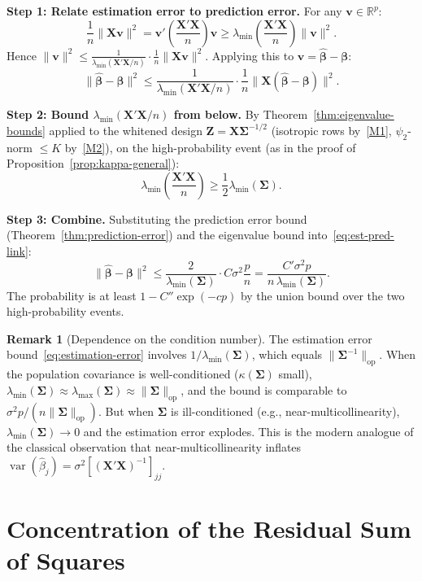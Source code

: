 \documentclass[12pt,a4paper]{article}
\makeatletter
\theoremstyle{definition}
\newtheorem{remark}[theorem]{Remark}
\renewenvironment{proof}[1][\proofname]{\par
  \pushQED{\qed}%
  \normalfont \topsep6\p@\@plus6\p@\relax
  \trivlist
  \item[\hskip\labelsep\bfseries #1\@addpunct{.}]\ignorespaces
}{%
  \popQED\endtrivlist\@endpefalse
}
\DeclareMathOperator\var{var}
\newcommand{\bX}{\mathbf{X}}
\def\bb{\boldsymbol{\beta}}
\newcommand{\bZ}{\mathbf{Z}}
\newcommand{\bv}{\mathbf{v}}
\newcommand{\Real}{\mathbb{R}}
\newcommand{\bSigma}{\boldsymbol{\Sigma}}
\newcommand{\hbb}{\hat{\boldsymbol{\beta}}}
\newcommand{\opnorm}[1]{\|#1\|_{\mathrm{op}}}
\makeatother
\begin{document}
\begin{proof}
\textbf{Step 1: Relate estimation error to prediction error.} For any $\bv \in \Real^p$:
\[
\frac{1}{n}\|\bX\bv\|^2 = \bv'\!\left(\frac{\bX'\bX}{n}\right)\bv \geqslant \lambda_{\min}\!\left(\frac{\bX'\bX}{n}\right)\|\bv\|^2.
\]
Hence $\|\bv\|^2 \leqslant \frac{1}{\lambda_{\min}(\bX'\bX/n)}\cdot\frac{1}{n}\|\bX\bv\|^2$. Applying this to $\bv = \hbb - \bb$:
\begin{equation}\label{eq:est-pred-link}
\|\hbb - \bb\|^2 \leqslant \frac{1}{\lambda_{\min}(\bX'\bX/n)}\cdot\frac{1}{n}\|\bX(\hbb - \bb)\|^2.
\end{equation}

\textbf{Step 2: Bound $\lambda_{\min}(\bX'\bX/n)$ from below.} By Theorem~\ref{thm:eigenvalue-bounds} applied to the whitened design $\bZ = \bX\bSigma^{-1/2}$ (isotropic rows by~\ref{M1}, $\psi_2$-norm $\leqslant K$ by~\ref{M2}), on the high-probability event (as in the proof of Proposition~\ref{prop:kappa-general}):
\[
\lambda_{\min}\!\left(\frac{\bX'\bX}{n}\right) \geqslant \frac{1}{2}\lambda_{\min}(\bSigma).
\]

\textbf{Step 3: Combine.} Substituting the prediction error bound (Theorem~\ref{thm:prediction-error}) and the eigenvalue bound into~\eqref{eq:est-pred-link}:
\[
\|\hbb - \bb\|^2 \leqslant \frac{2}{\lambda_{\min}(\bSigma)}\cdot C\sigma^2\frac{p}{n} = \frac{C'\sigma^2 p}{n\,\lambda_{\min}(\bSigma)}.
\]
The probability is at least $1 - C''\exp(-cp)$ by the union bound over the two high-probability events.
\end{proof}

\begin{remark}[Dependence on the condition number]
The estimation error bound~\eqref{eq:estimation-error} involves $1/\lambda_{\min}(\bSigma)$, which equals $\opnorm{\bSigma^{-1}}$. When the population covariance is well-conditioned ($\kappa(\bSigma)$ small), $\lambda_{\min}(\bSigma) \approx \lambda_{\max}(\bSigma) \approx \|\bSigma\|_{\mathrm{op}}$, and the bound is comparable to $\sigma^2 p/(n\opnorm{\bSigma})$. But when $\bSigma$ is ill-conditioned (e.g., near-multicollinearity), $\lambda_{\min}(\bSigma) \to 0$ and the estimation error explodes. This is the modern analogue of the classical observation that near-multicollinearity inflates $\var(\hat{\beta}_j) = \sigma^2[(\bX'\bX)^{-1}]_{jj}$.
\end{remark}

\section{Concentration of the Residual Sum of Squares}\label{sec:sse-concentration}
\end{document}
